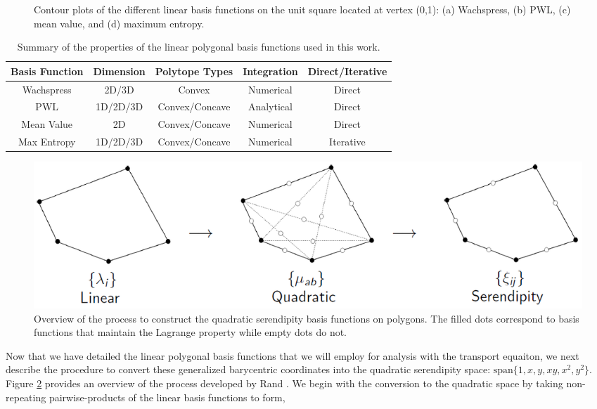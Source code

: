 \documentclass[11pt]{article}
\begin{document}
\begin{figure}
\begin{subfigure}[b]{0.30\textwidth}
		\caption{}
	\end{subfigure}
\caption{Contour plots of the different linear basis functions on the unit square located at vertex (0,1): (a) Wachspress, (b) PWL, (c) mean value, and (d) maximum entropy.}
\label{fig::2D_Linear_Summary_unit_square_basis_functions}
\end{figure}

\begin{table}
\caption{Summary of the properties of the linear polygonal basis functions used in this work.}
\centering
\begin{tabular}{|c|c|c|c|c|}
\hline
Basis Function & Dimension & Polytope Types & Integration & Direct/Iterative \\
\hline \hline
Wachspress	&2D/3D& Convex&	Numerical &Direct\\ \hline
PWL&	1D/2D/3D& Convex/Concave& Analytical &Direct\\ \hline
Mean Value&	2D& Convex/Concave& Numerical &Direct\\ \hline
Max Entropy& 1D/2D/3D &Convex/Concave& Numerical& Iterative\\ \hline
\end{tabular}
\label{tab::lin_poly_summary}
\end{table}

\begin{figure}
\centering
\includegraphics[width=\textwidth]{figures/linear_to_quad_process.png}
\caption{Overview of the process to construct the quadratic serendipity basis functions on polygons. The filled dots correspond to basis functions that maintain the Lagrange property while empty dots do not.}
\label{fig::lin_to_quad_process}
\end{figure}

Now that we have detailed the linear polygonal basis functions that we will employ for analysis with the transport equaiton, we next describe the procedure to convert these generalized barycentric coordinates into the quadratic serendipity space: $\text{span} \{   1,x,y,xy,x^2,y^2 \}$. Figure \ref{fig::lin_to_quad_process} provides an overview of the process developed by Rand \cite{rand2013interpolation}. We begin with the conversion to the quadratic space by taking non-repeating pairwise-products of the linear basis functions to form,
\end{document}
